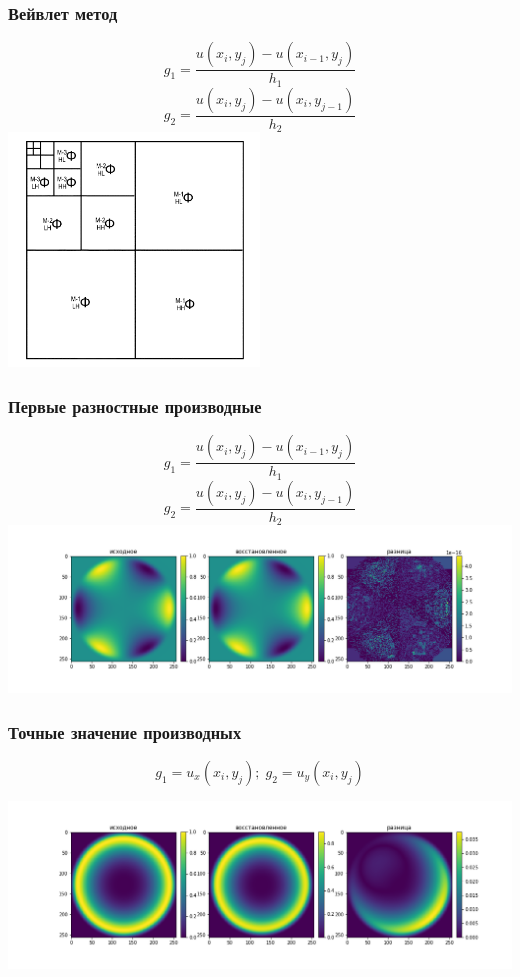 \documentclass{beamer}
\begin{document}
\begin{frame}
\frametitle{Вейвлет метод}
\begin{center}
			$$g_1= \frac{u(x_i,y_j) - u(x_{i-1},y_j)}{h_1}$$
			$$g_2= \frac{u(x_i,y_j) - u(x_i,y_{j-1})}{h_2}$$
\includegraphics[width=0.5\textwidth]{hwaf_decomp.png}

\end{center}
\end{frame}



\begin{frame}
\frametitle{Первые разностные производные}
\begin{center}
$$g_1= \frac{u(x_i,y_j) - u(x_{i-1},y_j)}{h_1}$$
$$g_2= \frac{u(x_i,y_j) - u(x_i,y_{j-1})}{h_2}$$
\includegraphics[width=1\textwidth]{Z_3^3.png}
\end{center}
\end{frame}

\begin{frame}
\frametitle{Точные значение производных}
$$g_1 = u_x(x_i,y_j);\; g_2 = u_y(x_i,y_j)$$
\begin{center}
\includegraphics[width=1\textwidth]{R_3^3_variant1.png}
\end{center}
\end{frame}
\end{document}
